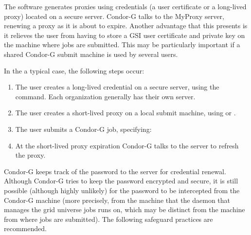 The  software generates proxies using credentials
(a user certificate or a long-lived proxy) located on a secure
 server.
Condor-G talks to the MyProxy server,
renewing a proxy as it is about to expire.
Another advantage that this presents is it relieves the user
from having to store a GSI user certificate and private key
on the machine where jobs are submitted.
This may be particularly important if a shared Condor-G
submit machine is used by several users.

In the a typical case, the following steps occur:

\begin{enumerate}
\item{The user creates a long-lived credential}
on a secure  server, using the
 command.
Each organization generally has their own  server.

\item{The user creates a short-lived proxy}
on a local submit machine,
using
 or .

\item{The user submits}
a Condor-G job,
specifying:

\item{At the short-lived proxy expiration}
Condor-G talks to
the  server to refresh the proxy.

\end{enumerate}


Condor-G keeps track of the password to the  server
for credential renewal.
Although Condor-G tries to keep the password encrypted and secure,
it is still possible (although highly unlikely) for the password
to be intercepted from the Condor-G machine
(more precisely, from the machine that the
 daemon that manages the grid universe jobs runs on,
which may be distinct from the machine from where jobs are submitted).
The following safeguard practices are recommended.

